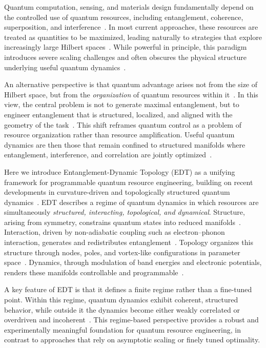 \documentclass[twocolumn,10pt]{article}
\begin{document}
Quantum computation, sensing, and materials design fundamentally depend on the controlled use of quantum resources, including entanglement, coherence, superposition, and interference~\cite{NielsenChuang,Horodecki2009,Streltsov2017}. In most current approaches, these resources are treated as quantities to be maximized, leading naturally to strategies that explore increasingly large Hilbert spaces~\cite{Preskill2018,Arute2019}. While powerful in principle, this paradigm introduces severe scaling challenges and often obscures the physical structure underlying useful quantum dynamics~\cite{Eisert2010,Altman2015}.

An alternative perspective is that quantum advantage arises not from the size of Hilbert space, but from the \emph{organization} of quantum resources within it~\cite{Amico2008,Swingle2018}. In this view, the central problem is not to generate maximal entanglement, but to engineer entanglement that is structured, localized, and aligned with the geometry of the task~\cite{Verstraete2008,Orus2014}. This shift reframes quantum control as a problem of resource organization rather than resource amplification. Useful quantum dynamics are then those that remain confined to structured manifolds where entanglement, interference, and correlation are jointly optimized~\cite{KimHuse2013,Choi2016}.

Here we introduce Entanglement-Dynamic Topology (EDT) as a unifying framework for programmable quantum resource engineering, building on recent developments in curvature-driven and topologically structured quantum dynamics~\cite{Hu2024_ACP,Hu2025_APQ,Hu2026_JPCM}. EDT describes a regime of quantum dynamics in which resources are simultaneously \emph{structured, interacting, topological, and dynamical}. Structure, arising from symmetry, constrains quantum states into reduced manifolds~\cite{Wigner1959,Georgi1999}. Interaction, driven by non-adiabatic coupling such as electron--phonon interaction, generates and redistributes entanglement~\cite{Mead1979,Yarkony1996}. Topology organizes this structure through nodes, poles, and vortex-like configurations in parameter space~\cite{Berry1984,Xiao2010}. Dynamics, through modulation of band energies and electronic potentials, renders these manifolds controllable and programmable~\cite{Bukov2015,Eckardt2017}.

A key feature of EDT is that it defines a finite regime rather than a fine-tuned point. Within this regime, quantum dynamics exhibit coherent, structured behavior, while outside it the dynamics become either weakly correlated or overdriven and incoherent~\cite{Larkin1969,Swingle2018}. This regime-based perspective provides a robust and experimentally meaningful foundation for quantum resource engineering, in contrast to approaches that rely on asymptotic scaling or finely tuned optimality.
\end{document}
